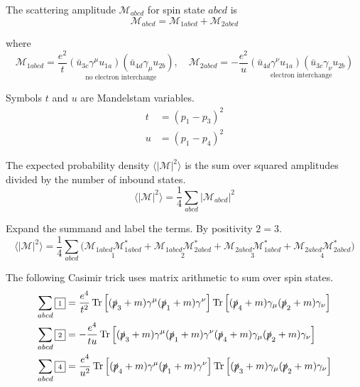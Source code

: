 The scattering amplitude $\mathcal M_{abcd}$ for spin state $abcd$ is
\begin{equation*}
\mathcal M_{abcd}=\mathcal M_{1abcd}+\mathcal M_{2abcd}
\end{equation*}

where
\begin{equation*}
\mathcal M_{1abcd}=\frac{e^2}{t}
\underset{\text{no electron interchange}}
{(\bar{u}_{3c}\gamma^\mu u_{1a})(\bar{u}_{4d}\gamma_\mu u_{2b})},
\quad
\mathcal M_{2abcd}=-\frac{e^2}{u}
\underset{\text{electron interchange}}
{(\bar{u}_{4d}\gamma^\nu u_{1a})(\bar{u}_{3c}\gamma_\nu u_{2b})}
\end{equation*}

Symbols $t$ and $u$ are Mandelstam variables.
\begin{align*}
t&=(p_1-p_3)^2
\\
u&=(p_1-p_4)^2
\end{align*}

The expected probability density $\langle|\mathcal M|^2\rangle$
is the sum over squared amplitudes divided by the number of inbound states.
\begin{equation*}
\langle|\mathcal M|^2\rangle=\frac{1}{4}\sum_{abcd}|\mathcal M_{abcd}|^2
\end{equation*}

Expand the summand and label the terms.
By positivity $\boxed{\scriptstyle2}=\boxed{\scriptstyle3}$.
\begin{equation*}
\langle|\mathcal{M}|^2\rangle=\frac{1}{4}
\sum_{abcd}
\bigl(
\underset{\boxed{\scriptstyle1}}
{\mathcal M_{1abcd}\mathcal M_{1abcd}^*}+
\underset{\boxed{\scriptstyle2}}
{\mathcal M_{1abcd}\mathcal M_{2abcd}^*}+
\underset{\boxed{\scriptstyle3}}
{\mathcal M_{2abcd}\mathcal M_{1abcd}^*}+
\underset{\boxed{\scriptstyle4}}
{\mathcal M_{2abcd}\mathcal M_{2abcd}^*}
\bigr)
\end{equation*}

The following Casimir trick uses matrix arithmetic to sum over spin states.
\begin{align*}
\sum_{abcd}\boxed{\scriptstyle1}&=\frac{e^4}{t^2}
\operatorname{Tr}\left[
(\slashed p_3+m)\gamma^\mu(\slashed p_1+m)\gamma^\nu
\right]
\operatorname{Tr}\left[
(\slashed p_4+m)\gamma_\mu(\slashed p_2+m)\gamma_\nu
\right]
\\
\sum_{abcd}\boxed{\scriptstyle2}&=-\frac{e^4}{tu}
\operatorname{Tr}\left[
(\slashed p_3+m)\gamma^\mu(\slashed p_1+m)\gamma^\nu
(\slashed p_4+m)\gamma_\mu(\slashed p_2+m)\gamma_\nu
\right]
\\
\sum_{abcd}\boxed{\scriptstyle4}&=\frac{e^4}{u^2}
\operatorname{Tr}\left[
(\slashed p_4+m)\gamma^\mu(\slashed p_1+m)\gamma^\nu
\right]
\operatorname{Tr}\left[
(\slashed p_3+m)\gamma_\mu(\slashed p_2+m)\gamma_\nu
\right]
\end{align*}

